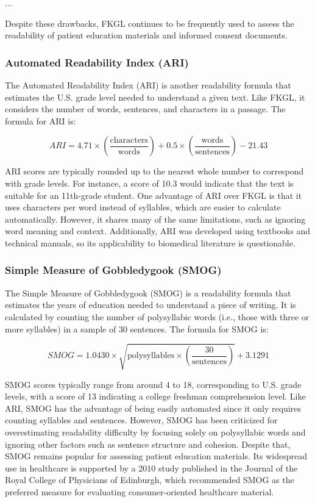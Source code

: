...

Despite these drawbacks, FKGL continues to be frequently used to assess the readability of patient education materials and informed consent documents.

\subsubsection{Automated Readability Index (ARI)}

The Automated Readability Index (ARI) is another readability formula that estimates the U.S. grade level needed to understand a given text. Like FKGL, it considers the number of words, sentences, and characters in a passage. The formula for ARI is:

$$ARI = 4.71 \times \left(\frac{\text{characters}}{\text{words}}\right) + 0.5 \times \left(\frac{\text{words}}{\text{sentences}}\right) - 21.43$$

ARI scores are typically rounded up to the nearest whole number to correspond with grade levels. For instance, a score of 10.3 would indicate that the text is suitable for an 11th-grade student.
One advantage of ARI over FKGL is that it uses characters per word instead of syllables, which are easier to calculate automatically. 
However, it shares many of the same limitations, such as ignoring word meaning and context. 
Additionally, ARI was developed using textbooks and technical manuals, so its applicability to biomedical literature is questionable.

\subsubsection{Simple Measure of Gobbledygook (SMOG)}

The Simple Measure of Gobbledygook (SMOG) is a readability formula that estimates the years of education needed to understand a piece of writing. It is calculated by counting the number of polysyllabic words (i.e., those with three or more syllables) in a sample of 30 sentences. 
The formula for SMOG is:

$$SMOG = 1.0430 \times \sqrt{\text{polysyllables} \times \left(\frac{30}{\text{sentences}}\right)} + 3.1291$$

SMOG scores typically range from around 4 to 18, corresponding to U.S. grade levels, with a score of 13 indicating a college freshman comprehension level.
Like ARI, SMOG has the advantage of being easily automated since it only requires counting syllables and sentences. However, SMOG has been criticized for overestimating readability difficulty by focusing solely on polysyllabic words and ignoring other factors such as sentence structure and cohesion. Despite that, SMOG remains popular for assessing patient education materials. Its widespread use in healthcare is supported by a 2010 study published in the Journal of the Royal College of Physicians of Edinburgh, which recommended SMOG as the preferred measure for evaluating consumer-oriented healthcare material.

